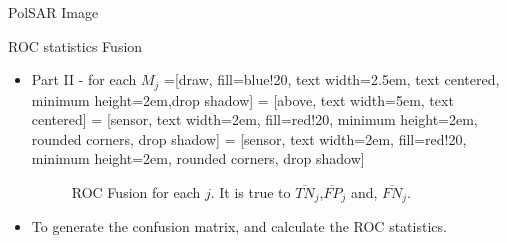 \documentclass[10pt]{beamer}
\begin{document}
\begin{frame}[fragile]{PolSAR Image}
\begin{alertblock}{ROC statistics Fusion}
\begin{itemize}
\item Part II - for each $M_j$
=[draw, fill=blue!20, text width=2.5em, 
    text centered, minimum height=2em,drop shadow]
 = [above, text width=5em, text centered]
 = [sensor, text width=2em, fill=red!20, 
    minimum height=2em, rounded corners, drop shadow]
 = [sensor, text width=2em, fill=red!20, 
    minimum height=2em, rounded corners, drop shadow]
\begin{figure}[hbt]
\caption{ROC Fusion for each $j$. It is true to $\overline{TN}_j$,$\overline{FP}_j$ and, $\overline{FN}_j$. }
\end{figure}
\item To generate the confusion matrix, and calculate the ROC statistics.
\end{itemize}
\end{alertblock}
\end{frame}
\end{document}
